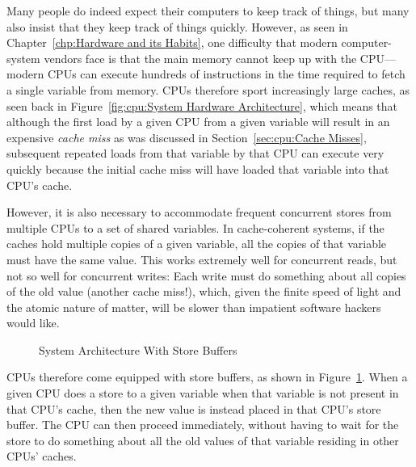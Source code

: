 Many people do indeed expect their computers to keep track of things,
but many also insist that they keep track of things quickly.
However, as seen in Chapter~\ref{chp:Hardware and its Habits},
one difficulty that modern computer-system vendors face is that
the main memory cannot keep up with the CPU---modern CPUs can execute
hundreds of instructions in the time required to fetch a single variable
from memory.
CPUs therefore sport increasingly large caches, as seen back in
Figure~\ref{fig:cpu:System Hardware Architecture}, which means that
although the first load by a given CPU from a given variable will
result in an expensive \emph{cache miss} as was discussed in
Section~\ref{sec:cpu:Cache Misses}, subsequent
repeated loads from that variable by that CPU can execute
very quickly because the initial cache miss will have loaded that
variable into that CPU's cache.

However, it is also necessary to accommodate frequent concurrent stores
from multiple CPUs to a set of shared variables.
In cache-coherent systems, if the caches hold multiple copies of a given
variable, all the copies of that variable must have the same value.
This works extremely well for concurrent reads, but not so well for
concurrent writes:  Each write must do something about all
copies of the old value (another cache miss!), which, given the finite
speed of light and the atomic nature of matter, will be slower
than impatient software hackers would like.

\begin{figure}[tb]
\centering
{}
\caption{System Architecture With Store Buffers}
\label{fig:advsync:System Architecture With Store Buffers}
\end{figure}

CPUs therefore come equipped with store buffers, as shown in
Figure~\ref{fig:advsync:System Architecture With Store Buffers}.
When a given CPU does a store to a given variable when that
variable is not present in that CPU's cache, then the new value
is instead placed in that CPU's store buffer.
The CPU can then proceed immediately, without having to wait for the
store to do something about all the old values of that variable
residing in other CPUs' caches.


